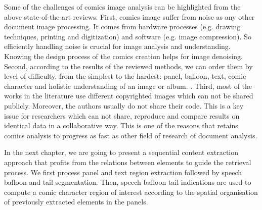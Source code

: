 Some of the challenges of comics image analysis can be highlighted from the above state-of-the-art reviews.
First, comics image suffer from noise as any other document image processing.
It comes from hardware processes (e.g. drawing techniques, printing and digitization) and software (e.g. image compression).
So efficiently handling noise is crucial for image analysis and understanding.
Knowing the design process of the comics creation helps for image denoising.
Second, according to the results of the reviewed methods, we can order them by level of difficulty, from the simplest to the hardest: panel, balloon, text, comic character and holistic understanding of an image or album.
.
Third, most of the works in the literature use different copyrighted images which can not be shared publicly.
Moreover, the authors usually do not share their code.
This is a key issue for researchers which can not share, reproduce and compare results on identical data in a collaborative way.
This is one of the reasons that retains comics analysis to progress as fast as other field of research of document analysis.


In the next chapter, we are going to present a sequential content extraction approach that profits from the relations between elements to guide the retrieval process.
We first process panel and text region extraction followed by speech balloon and tail segmentation.
Then, speech balloon tail indications are used to compute a comic character region of interest according to the spatial organisation of previously extracted elements in the panels.




